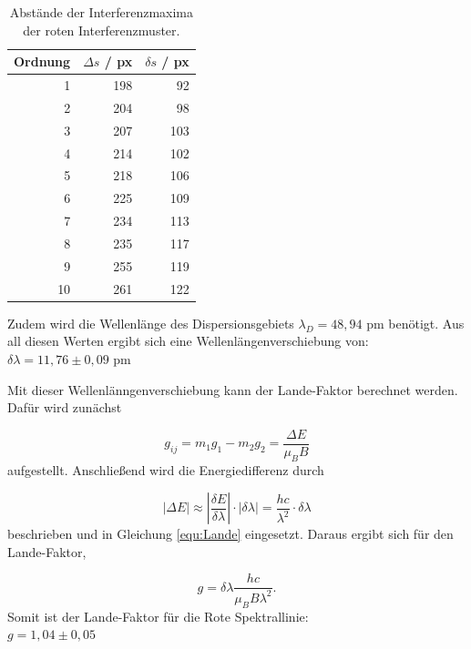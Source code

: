 \begin{table}
  \centering
  \footnotesize
  \caption{Abstände der Interferenzmaxima der roten Interferenzmuster.}
  \label{tab:Rot}

  \begin{tabular}{r r r}
    \toprule
    Ordnung & $\Delta s$ / px & $\delta s$ / px\\
    \midrule
    1   & 198 & 92  \\
    2   & 204 & 98  \\
    3   & 207 & 103 \\
    4   & 214 & 102 \\
    5   & 218 & 106 \\
    6   & 225 & 109 \\
    7   & 234 & 113 \\
    8   & 235 & 117 \\
    9   & 255 & 119 \\
    10  & 261 & 122 \\
    \bottomrule
  \end{tabular}
\end{table}

Zudem wird die Wellenlänge des Dispersionsgebiets $\lambda_D = 48,94$ pm benötigt.
Aus all diesen Werten ergibt sich eine Wellenlängenverschiebung von: \\
$\delta \lambda = 11,76 \pm 0,09$ pm

Mit dieser Wellenlänngenverschiebung kann der Lande-Faktor berechnet werden.
Dafür wird zunächst

\begin{equation}
  \label{equ:Lande}
  g_{ij} = m_1 g_1 - m_2 g_2 = \frac{\Delta E }{\mu_B B}
\end{equation}
aufgestellt.
Anschließend wird die Energiedifferenz durch 

\begin{equation}
  |\Delta E| \approx \left | \frac{\delta E}{\delta \lambda} \right | \cdot |\delta \lambda | = \frac{h c}{\lambda^2} \cdot \delta \lambda
\end{equation}
beschrieben und in Gleichung \eqref{equ:Lande} eingesetzt.
Daraus ergibt sich für den Lande-Faktor,

\begin{equation}
  g = \delta \lambda \frac{hc}{\mu_B B \lambda^2}.
\end{equation}
Somit ist der Lande-Faktor für die Rote Spektrallinie:\\
$g = 1,04 \pm 0,05$


